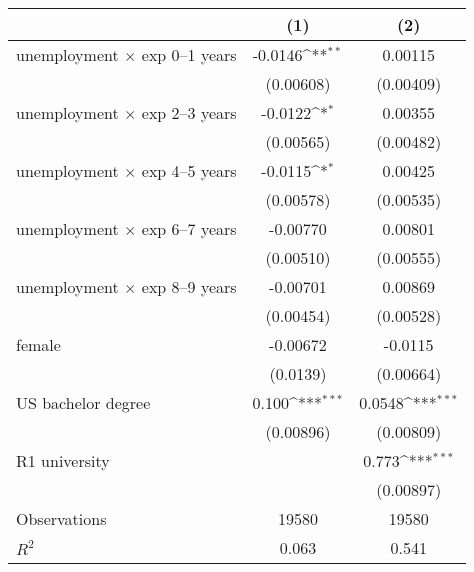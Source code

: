 \begin{table}[htbp]\centering
	\def\sym#1{\ifmmode^{#1}\else\(^{#1}\)\fi}
		\begin{adjustbox}{max width=0.4\textwidth}
\begin{tabular}{l*{2}{c}}
\hline\hline
            &\multicolumn{1}{c}{(1)}&\multicolumn{1}{c}{(2)}\\
\hline
unemployment $\times$ exp 0--1 years&     -0.0146\sym{**} &     0.00115         \\
            &   (0.00608)         &   (0.00409)         \\
[1em]
unemployment $\times$ exp 2--3 years&     -0.0122\sym{*}  &     0.00355         \\
            &   (0.00565)         &   (0.00482)         \\
[1em]
unemployment $\times$ exp 4--5 years&     -0.0115\sym{*}  &     0.00425         \\
            &   (0.00578)         &   (0.00535)         \\
[1em]
unemployment $\times$ exp 6--7 years&    -0.00770         &     0.00801         \\
            &   (0.00510)         &   (0.00555)         \\
[1em]
unemployment $\times$ exp 8--9 years&    -0.00701         &     0.00869         \\
            &   (0.00454)         &   (0.00528)         \\
[1em]
female  &    -0.00672         &     -0.0115         \\
            &    (0.0139)         &   (0.00664)         \\
[1em]
US bachelor degree     &       0.100\sym{***}&      0.0548\sym{***}\\
            &   (0.00896)         &   (0.00809)         \\
[1em]
R1 university    &                     &       0.773\sym{***}\\
            &                     &   (0.00897)         \\
\hline
Observations      &       19580         &       19580         \\
\(R^{2}\)   &       0.063         &       0.541         \\

\end{tabular}
\end{adjustbox}
\end{table}

